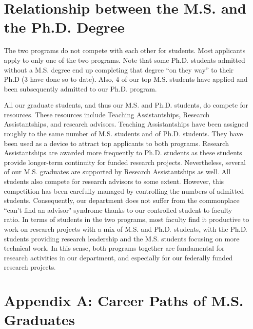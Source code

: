 \documentclass[12pt]{article}
\begin{document}
\section{Relationship between the M.S. and the Ph.D. Degree}
\label{sec.relationship}

The two programs do not compete with each other for students. Most
applicants apply to only one of the two programs. Note that some Ph.D.
students admitted without a M.S. degree end up completing that degree
``on they way'' to their Ph.D (3 have done so to date). Also, 4 of our
top M.S. students have applied and been subsequently admitted to our Ph.D. program.

All our graduate students, and thus our M.S. and Ph.D. students, do
compete for resources. These resources include Teaching
Assistantships, Research Assistantships, and research advisors.
Teaching Assistantships have been assigned roughly to the same number
of M.S. students and of Ph.D. students. They have been used as a
device to attract top applicants to both programs. Research
Assistantships are awarded more frequently to Ph.D. students as these
students provide longer-term continuity for funded research projects.
Nevertheless, several of our M.S. graduates are supported by Research
Assistantships as well. All students also compete for research
advisors to some extent. However, this competition has been carefully
managed by controlling the numbers of admitted students.
Consequently, our department does not suffer from the commonplace ``can't find an
advisor" syndrome thanks to our controlled student-to-faculty ratio.  In terms
of students in the two programs, most faculty find it productive to
work on research projects with a mix of M.S. and Ph.D. students, with
the Ph.D. students providing research leadership and the M.S. students
focusing on more technical work. In this sense, both programs together
are fundamental for research activities in our department, and
especially for our federally funded research projects.



\newpage
\section*{Appendix A: Career Paths of M.S. Graduates}
~\\
\end{document}
